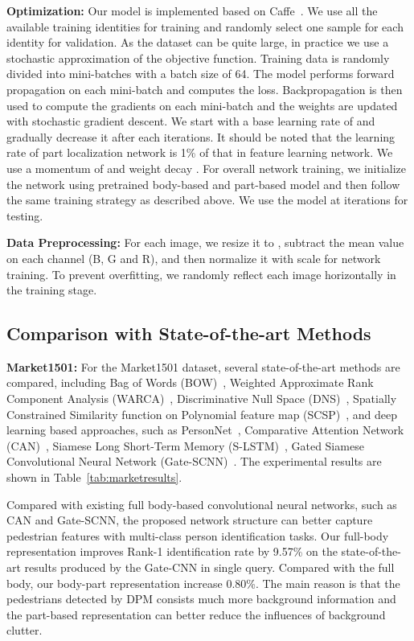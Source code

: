 \documentclass[10pt,twocolumn,letterpaper]{article}
\begin{document}
\textbf{Optimization:}
Our model is implemented based on Caffe~\cite{JiaMM14caffe}.
We use all the available training identities for training and randomly select one sample for each identity for validation.
As the dataset can be quite large, in practice we use a stochastic approximation of the objective function.
Training data is randomly divided into mini-batches with a batch size of 64.
The model performs forward propagation on each mini-batch and computes the loss.
Backpropagation is then used to compute the gradients on each mini-batch and the weights are updated with stochastic gradient descent.
We start with a base learning rate of  and gradually decrease it after each  iterations.
It should be noted that the learning rate of part localization network is 1\% of that in feature learning network.
We use a momentum of  and weight decay .
For overall network training, we initialize the network using pretrained body-based and part-based model and then follow the same training strategy as described above.
We use the model at  iterations for testing.

\textbf{Data Preprocessing:} For each image, we resize it to , subtract the mean value on each channel (B, G and R), and then normalize it with scale  for network training.
To prevent overfitting, we randomly reflect each image horizontally in the training stage.


\subsection{Comparison with State-of-the-art Methods}
\label{exp:stateoftheart}

\textbf{Market1501:} For the Market1501 dataset, several state-of-the-art methods are compared, including Bag of Words (BOW)~\cite{ZhengliangICCV15}, Weighted Approximate Rank Component Analysis (WARCA)~\cite{Jose2016scalable}, Discriminative Null Space (DNS)~\cite{ZhangLiCVPR16}, Spatially Constrained Similarity function on Polynomial feature map (SCSP)~\cite{ChendapengCVPR16similarity}, and deep learning based approaches, such as PersonNet~\cite{Wulin2016Personnet}, Comparative Attention Network (CAN)~\cite{Liu2016end}, Siamese Long Short-Term Memory (S-LSTM)~\cite{Varior2016Siamese}, Gated Siamese Convolutional Neural Network (Gate-SCNN)~\cite{VariorECCV16Gated}.
The experimental results are shown in Table~\ref{tab:marketresults}.

Compared with existing full body-based convolutional neural networks, such as CAN and Gate-SCNN, the proposed network structure can better capture pedestrian features with multi-class person identification tasks.
Our full-body representation improves Rank-1 identification rate by 9.57\% on the state-of-the-art results produced by the Gate-CNN in single query.
Compared with the full body, our body-part representation increase 0.80\%.
The main reason is that the pedestrians detected by DPM consists much more background information and the part-based representation can better reduce
the influences of background clutter.
\end{document}
